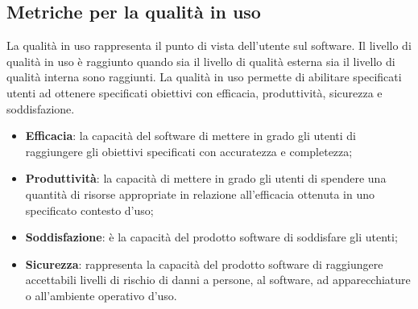 \subsection{Metriche per la qualità in uso}
La qualità in uso rappresenta il punto di vista dell'utente sul software. Il livello di qualità in uso è raggiunto quando sia il livello di qualità esterna sia il livello di qualità interna sono raggiunti. La qualità in uso permette di abilitare specificati utenti ad ottenere specificati obiettivi con efficacia, produttività, sicurezza e soddisfazione.
\begin{itemize}

    \item \textbf{Efficacia}: la capacità del software di mettere in grado gli utenti di raggiungere gli obiettivi specificati con accuratezza e completezza;
    
    \item \textbf{Produttività}: la capacità di mettere in grado gli utenti di spendere una quantità di risorse appropriate in relazione all'efficacia ottenuta in uno specificato contesto d'uso;
    
    \item \textbf{Soddisfazione}: è la capacità del prodotto software di soddisfare gli utenti;
    
    \item \textbf{Sicurezza}: rappresenta la capacità del prodotto software di raggiungere accettabili livelli di rischio di danni a persone, al software, ad apparecchiature o all'ambiente operativo d'uso.
    
\end{itemize}

